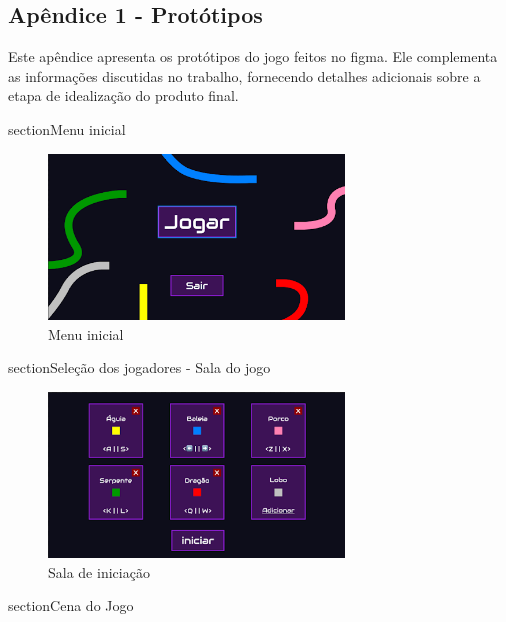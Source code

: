 \begin{apendicesenv}

\partapendices

\chapter{Apêndice 1 - Protótipos}

Este apêndice apresenta os protótipos do jogo feitos no figma. Ele complementa as informações discutidas no trabalho, fornecendo detalhes adicionais sobre a etapa de idealização do produto final.

section{Menu inicial}

\begin{figure}[htbp]
    \centering
    \caption{Menu inicial}
    \label{fig:prototipo-menu}
    \includegraphics[width=0.7\textwidth]{figuras/prototipo-menu.png}
\end{figure}

section{Seleção dos jogadores - Sala do jogo}

\begin{figure}[htbp]
    \centering
    \caption{Sala de iniciação}
    \label{fig:prototipo-lobby}
    \includegraphics[width=0.7\textwidth]{figuras/prototipo-lobby.png}
\end{figure}

section{Cena do Jogo}


\end{apendicesenv}
